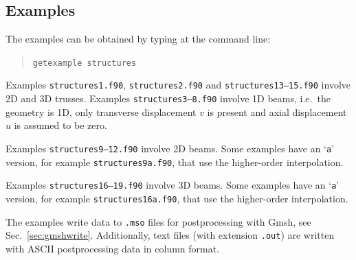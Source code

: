 \subsection{Examples}

The examples can be obtained by typing at the command line:
\begin{quote}
   \texttt{getexample structures}
\end{quote}
Examples \texttt{structures1.f90},  \texttt{structures2.f90} and \texttt{structures13--15.f90} involve 2D and 3D trusses. Examples \texttt{structures3--8.f90} involve 1D beams, i.e.\ the geometry is 1D, only transverse displacement $v$ is present and axial displacement $u$ is assumed to be zero. 

Examples \texttt{structures9--12.f90} involve 2D beams.
Some examples have an `\texttt{a}' version, for example \texttt{structures9a.f90}, that use the higher-order interpolation. 

Examples \texttt{structures16--19.f90} involve 3D beams.
Some examples have an `\texttt{a}' version, for example \texttt{structures16a.f90}, that use the higher-order interpolation. 

The examples write data to \texttt{.mso} files for postprocessing with Gmsh, see Sec.~\ref{sec:gmshwrite}. Additionally, text files (with extension \texttt{.out}) are written with ASCII postprocessing data in column format.

